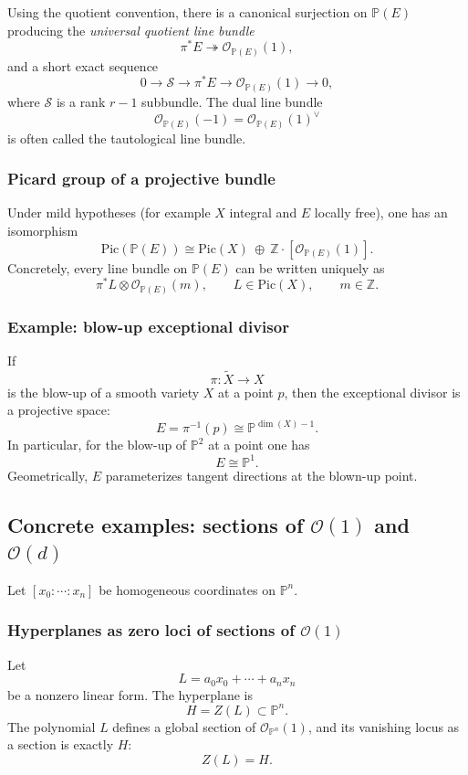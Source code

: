 \documentclass[12pt,a4paper]{article}
\theoremstyle{plain}
\theoremstyle{definition}      %
\begin{document}
Using the quotient convention, there is a canonical surjection on $\mathbb P(E)$ producing the \emph{universal quotient line bundle}
\[
\pi^{*}E \twoheadrightarrow \mathcal O_{\mathbb P(E)}(1),
\]
and a short exact sequence
\[
0\to \mathcal S \to \pi^{*}E \to \mathcal O_{\mathbb P(E)}(1)\to 0,
\]
where $\mathcal S$ is a rank $r-1$ subbundle.
The dual line bundle
\[
\mathcal O_{\mathbb P(E)}(-1)=\mathcal O_{\mathbb P(E)}(1)^{\vee}
\]
is often called the tautological line bundle.

\subsubsection*{Picard group of a projective bundle}

Under mild hypotheses (for example $X$ integral and $E$ locally free), one has an isomorphism
\[
\mathrm{Pic}(\mathbb P(E))
\cong
\mathrm{Pic}(X)\ \oplus\ \mathbb Z\cdot [\mathcal O_{\mathbb P(E)}(1)].
\]
Concretely, every line bundle on $\mathbb P(E)$ can be written uniquely as
\[
\pi^{*}L \otimes \mathcal O_{\mathbb P(E)}(m),
\qquad
L\in \mathrm{Pic}(X),
\qquad
m\in \mathbb Z.
\]

\subsubsection*{Example: blow-up exceptional divisor}

If
\[
\pi:\widetilde X\to X
\]
is the blow-up of a smooth variety $X$ at a point $p$, then the exceptional divisor is a projective space:
\[
E=\pi^{-1}(p)\cong \mathbb P^{\dim(X)-1}.
\]
In particular, for the blow-up of $\mathbb P^2$ at a point one has
\[
E\cong \mathbb P^1.
\]
Geometrically, $E$ parameterizes tangent directions at the blown-up point.

\subsection*{Concrete examples: sections of $\mathcal O(1)$ and $\mathcal O(d)$}

Let $[x_0:\cdots:x_n]$ be homogeneous coordinates on $\mathbb P^n$.

\subsubsection*{Hyperplanes as zero loci of sections of $\mathcal O(1)$}

Let
\[
L=a_0x_0+\cdots+a_nx_n
\]
be a nonzero linear form.
The hyperplane is
\[
H=Z(L)\subset \mathbb P^n.
\]
The polynomial $L$ defines a global section of $\mathcal O_{\mathbb P^n}(1)$, and its vanishing locus as a section is exactly $H$:
\[
Z(L)=H.
\]
\end{document}
